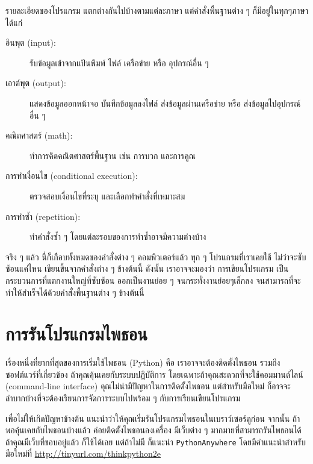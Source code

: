 รายละเอียดของโปรแกรม แตกต่างกันไปบ้างตามแต่ละภาษา แต่คำสั่งพื้นฐานต่าง ๆ ก็มีอยู่ในทุกๆภาษา ได้แก่

\begin{description}

\item[อินพุต (input):] รับข้อมูลเข้าจากแป้นพิมพ์ ไฟล์ เครือข่าย หรือ อุปกรณ์อื่น ๆ

\item[เอาต์พุต (output):] แสดงข้อมูลออกหน้าจอ บันทึกข้อมูลลงไฟล์ ส่งข้อมูลผ่านเครือข่าย หรือ ส่งข้อมูลไปอุปกรณ์อื่น ๆ
    
\item[คณิตศาสตร์ (math):] ทำการคิดคณิตศาสตร์พื้นฐาน เช่น การบวก และการคูณ
    
\item[การทำเงื่อนไข (conditional execution):] ตรวจสอบเงื่อนไขที่ระบุ และเลือกทำคำสั่งที่เหมาะสม
    
\item[การทำซ้ำ (repetition):] ทำคำสั่งซ้ำ ๆ โดยแต่ละรอบของการทำซ้ำอาจมีความต่างบ้าง

\end{description}

จริง ๆ แล้ว นี่ก็เกือบทั้งหมดของคำสั่งต่าง ๆ คอมพิวเตอร์แล้ว
ทุก ๆ โปรแกรมที่เราเคยใช้ ไม่ว่าจะซับซ้อนแค่ไหน เขียนขึ้นจากคำสั่งต่าง ๆ ข้างต้นนี้
ดังนั้น เราอาจจะมองว่า การเขียนโปรแกรม เป็น กระบวนการที่แตกงานใหญ่ที่ซับซ้อน ออกเป็นงานย่อย ๆ จนกระทั่งงานย่อยๆเล็กลง จนสามารถที่จะทำให้สำเร็จได้ด้วยคำสั่งพื้นฐานต่าง ๆ ข้างต้นนี้

\section{การรันโปรแกรมไพธอน}

เรื่องหนึ่งที่ยากที่สุดของการเริ่มใช้ไพธอน (Python) คือ เราอาจจะต้องติดตั้งไพธอน รวมถึงซอฟต์แวร์ที่เกี่ยวข้อง
ถ้าคุณคุ้นเคยกับระบบปฏิบัติการ โดยเฉพาะถ้าคุณสะดวกที่จะใช้คอมมานด์ไลน์ (command-line interface) คุณไม่น่ามีปัญหาในการติดตั้งไพธอน
แต่สำหรับมือใหม่ ก็อาจจะลำบากบ้างที่จะต้องเรียนการจัดการระบบไปพร้อม ๆ กับการเรียนเขียนโปรแกรม

เพื่อไม่ให้เกิดปัญหาข้างต้น แนะนำว่าให้คุณเริ่มรันโปรแกรมไพธอนในเบราว์เซอร์ดูก่อน
จากนั้น ถ้าพอคุ้นเคยกับไพธอนบ้างแล้ว ค่อยติดตั้งไพธอนลงเครื่อง
มีเว็บต่าง ๆ มากมายที่สามารถรันไพธอนได้ ถ้าคุณมีเว็บที่ชอบอยู่แล้ว ก็ใช้ได้เลย
แต่ถ้าไม่มี ก็แนะนำ \texttt{PythonAnywhere} โดยมีคำแนะนำสำหรับมือใหม่ที่ \url{http://tinyurl.com/thinkpython2e}

